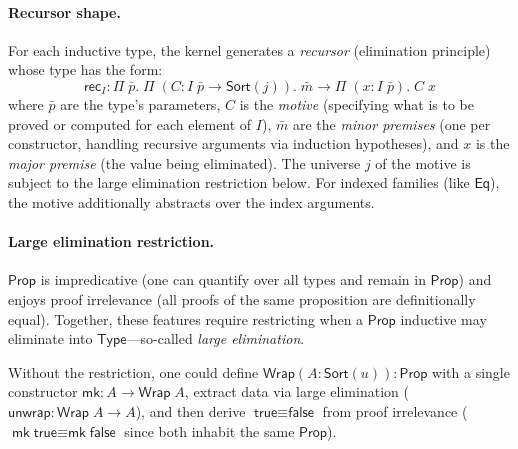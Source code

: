 \documentclass[11pt]{article}
\theoremstyle{definition}
\theoremstyle{plain}
\theoremstyle{remark}
\newcommand{\Sort}{\textsf{Sort}}
\newcommand{\Prop}{\textsf{Prop}}
\newcommand{\Type}{\textsf{Type}}
\newcommand{\Eq}{\textsf{Eq}}
\begin{document}
\paragraph{Recursor shape.}
For each inductive type, the kernel generates a \emph{recursor} (elimination principle)
whose type has the form:
\[
  \textsf{rec}_I : \Pi\;\bar{p}.\; \Pi\;(C : I\;\bar{p} \to \Sort(j)).\;
  \bar{m} \to \Pi\;(x : I\;\bar{p}).\; C\;x
\]
where $\bar{p}$ are the type's parameters, $C$ is the \emph{motive}
(specifying what is to be proved or computed for each element of $I$),
$\bar{m}$ are the \emph{minor premises} (one per constructor, handling recursive
arguments via induction hypotheses), and $x$ is the \emph{major premise}
(the value being eliminated).
The universe $j$ of the motive is subject to the large elimination restriction below.
For indexed families (like $\Eq$), the motive additionally abstracts over the index arguments.

\paragraph{Large elimination restriction.}
$\Prop$ is impredicative (one can quantify over all types and remain in $\Prop$)
and enjoys proof irrelevance (all proofs of the same proposition are definitionally equal).
Together, these features require restricting when a $\Prop$ inductive may eliminate
into $\Type$---so-called \emph{large elimination}.

Without the restriction, one could define $\textsf{Wrap}(A : \Sort(u)) : \Prop$ with a
single constructor $\textsf{mk} : A \to \textsf{Wrap}\;A$, extract data via large elimination
($\textsf{unwrap} : \textsf{Wrap}\;A \to A$), and then derive $\textsf{true} \equiv \textsf{false}$
from proof irrelevance ($\textsf{mk}\;\textsf{true} \equiv \textsf{mk}\;\textsf{false}$
since both inhabit the same $\Prop$).
\end{document}
